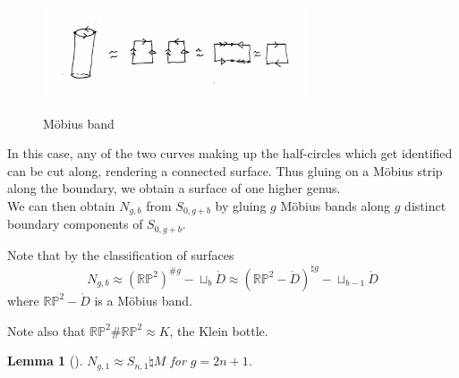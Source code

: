 \documentclass[reqno]{amsart}
\newtheorem{lemma}[theorem]{Lemma}
\theoremstyle{definition}
\theoremstyle{remark}
\begin{document}
\begin{figure}[htpb]
    \centering
    \includegraphics[width=0.7\textwidth]{mapping-cylinder-mobius.jpg}
    \label{fig:mapping-cylinder-mobius}
    \caption{Möbius band}
\end{figure}

In this case, any of the two curves making up the half-circles which
get identified can be cut along, rendering a connected surface.
Thus gluing on a Möbius strip along the boundary, we obtain a
surface of one higher genus.\\


We can then obtain $N_{g,b}$ from $S_{0,g+b}$ by
gluing $g$ Möbius bands along $g$ distinct boundary
components of $S_{0,g+b}$.

Note that by the classification of surfaces
\[
N_{g,b} \approx \left( \mathbb{R}\mathbb{P}^2 \right)^{\# g} -
\sqcup_{b} \mathring{D} \approx 
 \left(\mathbb{R}\mathbb{P}^2 - \mathring{D} 
\right)^{\natural g} - \sqcup_{b-1} \mathring{D}
\] 
where $\mathbb{R}\mathbb{P}^2 - \mathring{D}$ is a Möbius band.

Note also that $\mathbb{R}\mathbb{P}^2 \# \mathbb{R}\mathbb{P}^2
\approx K$, the Klein bottle.


\begin{lemma}[]\label{prop61}
    $N_{g,1} \approx S_{n,1} \natural M$ for
    $g = 2n+1$.
\end{lemma}
\end{document}
